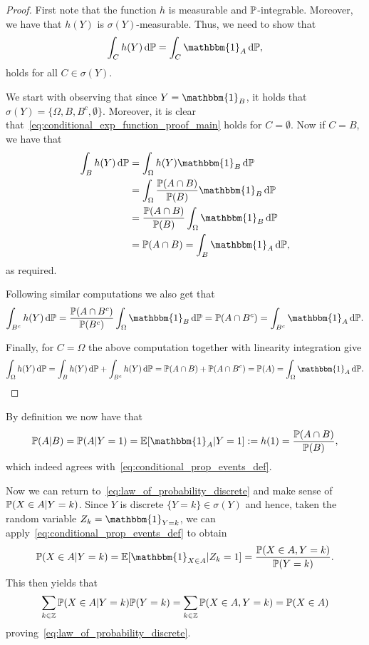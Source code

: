 \begin{proof}
First note that the function $h$ is measurable and $\mathbb P$-integrable. Moreover, we have that $h(Y)$ is $\sigma(Y)$-measurable. Thus, we need to show that
\begin{equation}\label{eq:conditional_exp_function_proof_main}
	\int_C h(Y) \, \dd \bbP = \int_C \mathbbm{1}_A \, \dd \bbP,
\end{equation}
holds for all $C \in \sigma(Y)$.

We start with observing that since $Y = \mathbbm{1}_B$, it holds that $\sigma(Y) = \{\Omega, B, B^c, \emptyset\}$. Moreover, it is clear that~\eqref{eq:conditional_exp_function_proof_main} holds for $C = \emptyset$. Now if $C = B$, we have that
\begin{align*}
	\int_B h(Y) \, \dd \bbP &= \int_\Omega h(Y) \mathbbm{1}_B \, \dd \bbP \\
	&= \int_\Omega \frac{\bbP(A \cap B)}{\bbP(B)} \mathbbm{1}_B \, \dd \bbP \\
	&= \frac{\bbP(A \cap B)}{\bbP(B)} \int_\Omega \mathbbm{1}_B \, \dd \bbP \\
	&= \bbP(A \cap B) = \int_B \mathbbm{1}_A \, \dd \bbP,
\end{align*}
as required.

Following similar computations we also get that
\[
	\int_{B^c} h(Y) \, \dd \bbP = \frac{\bbP(A \cap B^c)}{\bbP(B^c)} \int_\Omega \mathbbm{1}_B \, \dd \bbP
	= \bbP(A \cap B^c) = \int_{B^c} \mathbbm{1}_A \, \dd \bbP.
\]

Finally, for $C = \Omega$ the above computation together with linearity integration give
\[
	\int_\Omega h(Y) \, \dd \bbP = \int_B h(Y) \, \dd \bbP + \int_{B^c} h(Y) \, \dd \bbP
	= \bbP(A \cap B) + \bbP(A \cap B^c) = \bbP(A) = \int_\Omega \mathbbm{1}_A \, \dd \bbP.
\]
\end{proof}

By definition we now have that 
\[
	\bbP(A | B) = \bbP(A | Y = 1) = \bbE[\mathbbm{1}_A | Y = 1] := h(1) = \frac{\bbP(A \cap B)}{\bbP(B)},
\]
which indeed agrees with~\eqref{eq:conditional_prop_events_def}.


Now we can return to~\eqref{eq:law_of_probability_discrete} and make sense of $\mathbb P(X \in A | Y = k)$. Since $Y$ is discrete $\{Y = k\} \in \sigma(Y)$ and hence, taken the random variable $Z_k = \mathbbm{1}_{Y = k}$, we can apply~\ref{eq:conditional_prop_events_def} to obtain 
\[
	\bbP(X \in A | Y = k) = \bbE[\mathbbm{1}_{X \in A} | Z_k = 1]
	= \frac{\bbP(X \in A, Y = k)}{\bbP(Y = k)}.
\]
This then yields that
\[
	\sum_{k \in \mathbb{Z}} \mathbb P(X \in A | Y = k) \mathbb P(Y = k) 
	= \sum_{k \in \mathbb{Z}} \mathbb P(X \in A, Y = k) = \mathbb P(X \in A)
\]
proving~\eqref{eq:law_of_probability_discrete}.

